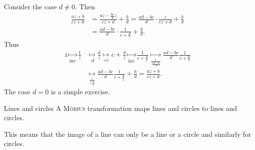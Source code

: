 \documentclass[a4paper,english]{article}
\begin{document}
\begin{pr}
    Consider the case $d \ne 0$.
    Then 
    \begin{align*}
        \frac{a z + b}{c z + d}
        & = \frac{a z - \frac{b c}{d} z}{c z + d} + \frac{b}{d}
        = \frac{a d - b c}{d} \cdot \frac{z}{c z + d} + \frac{b}{d} \\
        & = \frac{a d - b c}{d} \cdot \frac{1}{c + \frac{d}{z}} + \frac{b}{d}. 
    \end{align*}
    Thus
    \begin{align*}
        z \underset{\text{inv}}{\longmapsto} \frac{1}{z}
        & \underset{\cdot d}{\longmapsto} \frac{d}{z}
        \underset{+ c}{\longmapsto} c + \frac{d}{z}
        \underset{\text{inv}}{\longmapsto} \frac{1}{c + \frac{d}{z}}
        \underset{\frac{1}{\cdot \frac{a d - b c}{d}}}{\longmapsto}  \frac{a d - b c}{d} \frac{1}{c + \frac{d}{z}} \\
        & \underset{\frac{1}{+ \frac{b}{d}}}{\longmapsto}  \frac{a d - b c}{d} \frac{1}{c + \frac{d}{z}} + \frac{b}{d}
        = \frac{a z + b}{c z + d}.
    \end{align*}
    The case $d = 0$ is a simple exercise.
\end{pr}

\begin{thm}{Lines and circles}{}
    A \textsc{Möbius} transformation maps lines and circles to lines and circles.
\end{thm}
This means that the image of a line can only be a line or a circle and similarly for circles.
\end{document}
